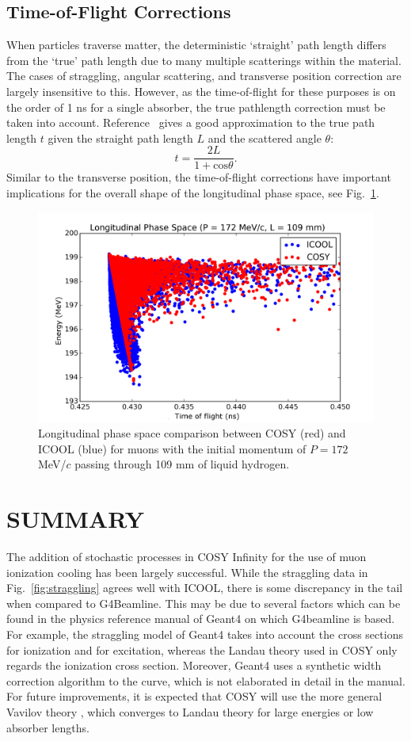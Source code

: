 \documentclass{jacow}
\begin{document}
\subsection{Time-of-Flight Corrections}
When particles traverse matter, the deterministic `straight' path length differs from the `true' path length due to many multiple scatterings within the material. The cases of straggling, angular scattering, and transverse position correction are largely insensitive to this. However, as the time-of-flight for these purposes is on the order of 1 ns for a single absorber, the true pathlength correction must be taken into account. Reference~\cite{Bielajew} gives a good approximation to the true path length $t$ given the straight path length $L$ and the scattered angle $\theta$:
\[
t = \frac{2L}{1+\text{cos}\theta}.
\]
Similar to the transverse position, the time-of-flight corrections have important implications for the overall shape of the longitudinal phase space, see Fig.~\ref{fig:tof}.

\begin{figure}[htbf]
\centering
\includegraphics[width=\columnwidth]{tof}
\caption{Longitudinal phase space comparison between COSY (red) and ICOOL (blue) for muons with the initial momentum of $P=172$ MeV/$c$ passing through 109 mm of liquid hydrogen.}
\label{fig:tof}
\end{figure}

\section{SUMMARY}
The addition of stochastic processes in COSY Infinity for the use of muon ionization cooling has been largely successful. While the straggling data in Fig.~\ref{fig:straggling} agrees well with ICOOL, there is some discrepancy in the tail when compared to G4Beamline. This may be due to several factors which can be found in the physics reference manual of Geant4 \cite{GEANT4} on which G4beamline is based. For example, the straggling model of Geant4 takes into account the cross sections for ionization and for excitation, whereas the Landau theory used in COSY only regards the ionization cross section. Moreover, Geant4 uses a synthetic width correction algorithm to the curve, which is not elaborated in detail in the manual. For future improvements, it is expected that COSY will use the more general Vavilov theory \cite{VAVILOV}, which converges to Landau theory for large energies or low absorber lengths. 
\end{document}
